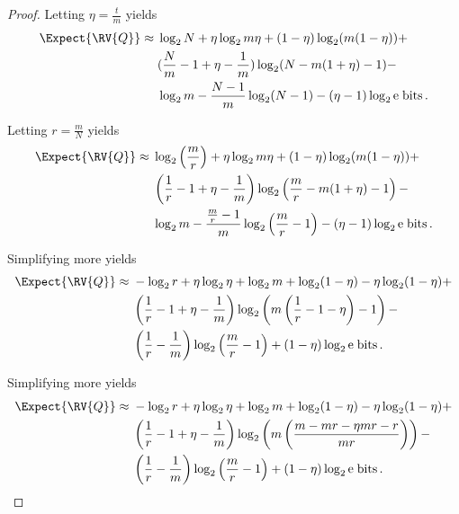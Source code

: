 \documentclass[ ../main.tex]{subfiles}
\begin{document}
\begin{proof}
	Letting $\eta = \frac{t}{m}$ yields
	\begin{equation}
	\begin{split}
	\Expect{\RV{Q}} \approx \;
	&\log_2 N + \eta \log_2 m \eta  + \left(1 - \eta\right) \log_2 (m(1 - \eta)) +\\
	&(\frac{N}{m} - 1 + \eta - \frac{1}{m}) \log_2 (N - m(1 + \eta) - 1) -\\
	&\log_2 m - \frac{N-1}{m} \log_2 (N-1) - \left(\eta - 1\right) \log_2 \mathrm{e} \; \si{bits}\,.
	\end{split}
	\end{equation}
	
	Letting $r = \frac{m}{N}$ yields
	\begin{equation}
	\begin{split}
	\Expect{\RV{Q}} \approx \;
	&\log_2\left(\frac{m}{r}\right) + \eta \log_2 m \eta  + \left(1 - \eta\right) \log_2 (m(1 - \eta)) +\\
	&\left(\frac{1}{r} - 1 + \eta - \frac{1}{m}\right) \log_2\left(\frac{m}{r} - m(1 + \eta) - 1\right) -\\
	&\log_2 m - \frac{\frac{m}{r}-1}{m} \log_2\left(\frac{m}{r}-1\right) - \left(\eta - 1\right) \log_2 \mathrm{e} \; \si{bits}\,.
	\end{split}
	\end{equation}
	
	Simplifying more yields
	\begin{equation}
	\begin{split}
	\Expect{\RV{Q}} \approx \;
	&- \log_2 r + \eta \log_2 \eta + \log_2 m + \log_2(1 - \eta) - \eta \log_2(1 - \eta) +\\
	&\left(\frac{1}{r} - 1 + \eta - \frac{1}{m}\right) \log_2\left(m\left(\frac{1}{r} - 1 - \eta\right) - 1\right) -\\
	&\left(\frac{1}{r}-\frac{1}{m}\right) \log_2\left(\frac{m}{r}-1\right) + \left(1 -\eta\right) \log_2 \mathrm{e} \; \si{bits}\,.
	\end{split}
	\end{equation}
	
	
	
	Simplifying more yields
	\begin{equation}
	\begin{split}
	\Expect{\RV{Q}} \approx \;
	&- \log_2 r + \eta \log_2 \eta + \log_2 m + \log_2(1 - \eta) - \eta \log_2(1 - \eta) +\\
	&\left(\frac{1}{r} - 1 + \eta - \frac{1}{m}\right) \log_2\left(m\left(\frac{m - m r - \eta m r - r}{m r}\right)\right) -\\
	&\left(\frac{1}{r}-\frac{1}{m}\right) \log_2\left(\frac{m}{r}-1\right) + \left(1 -\eta\right) \log_2 \mathrm{e} \; \si{bits}\,.
	\end{split}
	\end{equation}
	

\end{proof}
\end{document}
